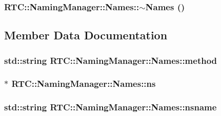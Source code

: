 \subsubsection[{$\sim$Names}]{\setlength{\rightskip}{0pt plus 5cm}RTC::NamingManager::Names::$\sim$Names ()\hspace{0.3cm}{\ttfamily  [inline]}}\label{classRTC_1_1NamingManager_1_1Names_ac85bbc0dd044798db451ba1b78565088}


\subsection{Member Data Documentation}
\subsubsection[{method}]{\setlength{\rightskip}{0pt plus 5cm}std::string {\bf RTC::NamingManager::Names::method}}\label{classRTC_1_1NamingManager_1_1Names_af91cd5f33926928072f5f620a83c5ace}
\subsubsection[{ns}]{$\ast$ {\bf RTC::NamingManager::Names::ns}}\label{classRTC_1_1NamingManager_1_1Names_a704904910fea3bf04cf6db7126ec3c29}
\subsubsection[{nsname}]{\setlength{\rightskip}{0pt plus 5cm}std::string {\bf RTC::NamingManager::Names::nsname}}\label{classRTC_1_1NamingManager_1_1Names_afd60a3c02c75c896ef6110f02acf25b0}
